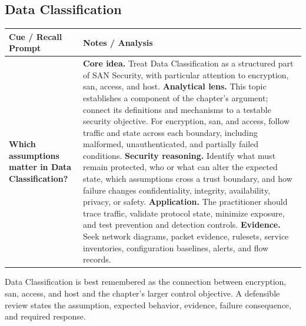 \documentclass[11pt]{article}
\newcommand{\CornellHeader}{%
\rowcolor{Navy}\color{white}\bfseries Cue / Recall Prompt & \color{white}\bfseries Notes / Analysis\\\hline}
\newcommand{\CornellRow}[2]{%
\cellcolor{CueGray}\RaggedRight\textbf{#1} & \RaggedRight #2\\\hline}
\begin{document}
\subsection*{Data Classification}
\begin{longtable}{>{\RaggedRight\arraybackslash}p{}|>{\RaggedRight\arraybackslash}p{}}
\CornellHeader
\CornellRow{Which assumptions matter in Data Classification?}{\textbf{Core idea.} Treat Data Classification as a structured part of SAN Security, with particular attention to encryption, san, access, and host. \textbf{Analytical lens.} This topic establishes a component of the chapter's argument; connect its definitions and mechanisms to a testable security objective. For encryption, san, and access, follow traffic and state across each boundary, including malformed, unauthenticated, and partially failed conditions. \textbf{Security reasoning.} Identify what must remain protected, who or what can alter the expected state, which assumptions cross a trust boundary, and how failure changes confidentiality, integrity, availability, privacy, or safety. \textbf{Application.} The practitioner should trace traffic, validate protocol state, minimize exposure, and test prevention and detection controls. \textbf{Evidence.} Seek network diagrams, packet evidence, rulesets, service inventories, configuration baselines, alerts, and flow records.}
\end{longtable}
\begin{topicsummary}
Data Classification is best remembered as the connection between encryption, san, access, and host and the chapter's larger control objective. A defensible review states the assumption, expected behavior, evidence, failure consequence, and required response.
\end{topicsummary}
\end{document}
